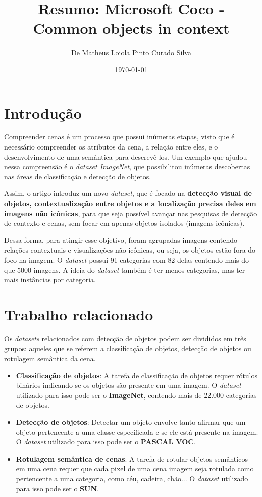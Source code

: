 \documentclass[12pt]{article}
\title{Resumo: Microsoft Coco - Common objects in context}
\author{De Matheus Loiola Pinto Curado Silva}
\date{\today}
\begin{document}
	
\maketitle

\tableofcontents

\section*{Introdução}

Compreender cenas é um processo que possui inúmeras etapas, visto que é necessário compreender os atributos da cena, a relação entre eles, e o desenvolvimento de uma semântica para descrevê-los. Um exemplo que ajudou nessa compreensão é o \textit{dataset ImageNet}, que possibilitou inúmeras descobertas nas áreas de classificação e detecção de objetos. 

Assim, o artigo introduz um novo \textit{dataset}, que é focado na \textbf{detecção visual de objetos, contextualização entre objetos e a localização precisa deles em imagens não icônicas}, para que seja possível avançar nas pesquisas de detecção de contexto e cenas, sem focar em apenas objetos isolados (imagens icônicas).

Dessa forma, para atingir esse objetivo, foram agrupadas imagens contendo relações contextuais e visualizações não icônicas, ou seja, os objetos estão fora do foco na imagem. O \textit{dataset} possui 91 categorias com 82 delas contendo mais do que 5000 imagens. A ideia do \textit{dataset} também é ter menos categorias, mas ter mais instâncias por categoria.

\section*{Trabalho relacionado}

Os \textit{datasets} relacionados com detecção de objetos podem ser divididos em três grupos: aqueles que se referem a classificação de objetos, detecção de objetos ou rotulagem semântica da cena.

\begin{itemize}
    \item
    \textbf{Classificação de objetos}: A tarefa de classificação de objetos requer rótulos binários indicando se os objetos são presente em uma imagem. O \textit{dataset} utilizado para isso pode ser o \textbf{ImageNet}, contendo mais de 22.000 categorias de objetos.

    \item
    \textbf{Detecção de objetos}: Detectar um objeto envolve tanto afirmar que um objeto pertencente a uma classe especificada e se ele está presente na imagem. O \textit{dataset} utilizado para isso pode ser o \textbf{PASCAL VOC}.

    \item
    \textbf{Rotulagem semântica de cenas}: A tarefa de rotular objetos semânticos em uma cena requer que cada pixel de uma cena imagem seja rotulada como pertencente a uma categoria, como céu, cadeira, chão... O \textit{dataset} utilizado para isso pode ser o \textbf{SUN}.
\end{itemize}
\end{document}

